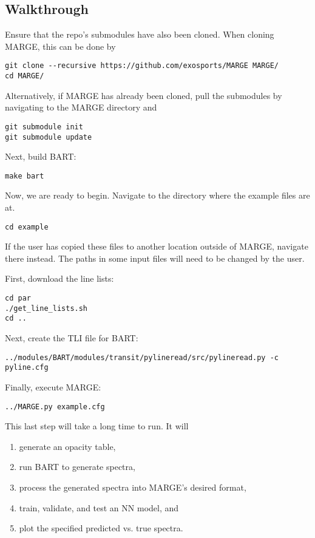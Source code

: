 \documentclass[letterpaper, 12pt]{article}
\begin{document}
\subsection{Walkthrough}

Ensure that the repo's submodules have also been cloned.  
When cloning MARGE, this can be done by
\begin{verbatim}
git clone --recursive https://github.com/exosports/MARGE MARGE/
cd MARGE/
\end{verbatim}
Alternatively, if MARGE has already been cloned, pull the submodules by 
navigating to the MARGE directory and 
\begin{verbatim}
git submodule init
git submodule update
\end{verbatim}

\noindent Next, build BART:
\begin{verbatim}
make bart
\end{verbatim}

\noindent Now, we are ready to begin.
Navigate to the directory where the example files are at.
\begin{verbatim}
cd example
\end{verbatim}
If the user has copied these files to another location outside of MARGE, 
navigate there instead.  The paths in some input files will need to be changed 
by the user. \newline

\noindent First, download the line lists:
\begin{verbatim}
cd par
./get_line_lists.sh
cd ..
\end{verbatim}

\noindent Next, create the TLI file for BART:
\begin{verbatim}
../modules/BART/modules/transit/pylineread/src/pylineread.py -c pyline.cfg
\end{verbatim}

\noindent Finally, execute MARGE:
\begin{verbatim}
../MARGE.py example.cfg
\end{verbatim}

\noindent This last step will take a long time to run.  It will 
\begin{enumerate}
\item generate an opacity table,
\item run BART to generate spectra,
\item process the generated spectra into MARGE's desired format,
\item train, validate, and test an NN model, and
\item plot the specified predicted vs. true spectra.
\end{enumerate}
\end{document}
